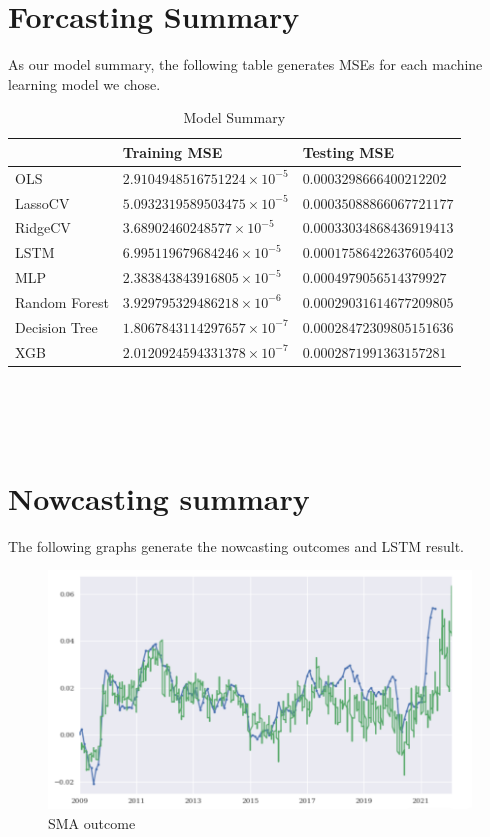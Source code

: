 \documentclass[reqno]{amsart}
\theoremstyle{definition}
\begin{document}
\section{Forcasting Summary}
As our model summary, the following table generates MSEs for each machine
learning model we chose.
\begin{table}[h]
\begin{center}
\caption{Model Summary}
\begin{tabular}{|l|l|l|}
\hline
& Training MSE & Testing MSE\\
\hline
OLS & $2.9104948516751224 \times 10^{-5}$ & $0.0003298666400212202$ \\
\hline
LassoCV & $5.0932319589503475 \times 10^{-5}$ & $0.00035088866067721177$ \\
\hline
RidgeCV & $3.68902460248577\times10^{-5}$ & $0.00033034868436919413$\\
\hline
LSTM & $6.995119679684246\times 10^{-5}$ & $0.00017586422637605402$ \\
\hline
MLP & $2.383843843916805\times 10^{-5}$ & $0.0004979056514379927$ \\
\hline
Random Forest & $3.929795329486218\times 10^{-6}$ & $0.00029031614677209805$ \\
\hline
Decision Tree & $1.8067843114297657\times10^{-7}$ &  $0.00028472309805151636$\\
\hline
XGB & $2.0120924594331378\times 10^{-7}$ & $0.0002871991363157281$ \\
\hline
\end{tabular}
\end{center}
\end{table}

~\\
~\\
~\\

\section{Nowcasting summary}
The following graphs generate the nowcasting outcomes and LSTM result.

\begin{figure}[t]
\centering
\caption{SMA outcome}
\includegraphics[scale=0.8]{SMA.png}
\end{figure}
\end{document}
